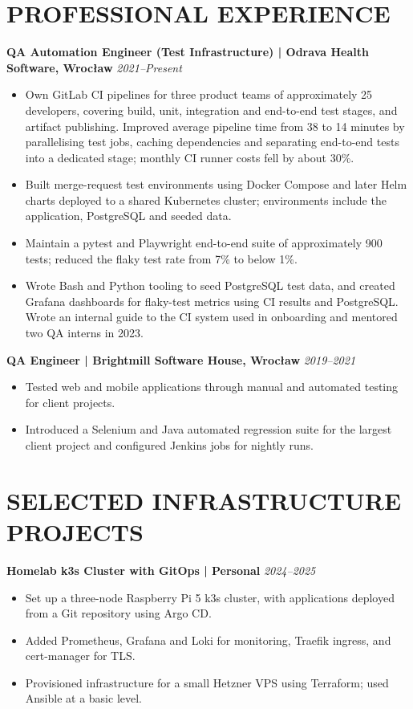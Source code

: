 \documentclass[11pt,a4paper]{article}
\begin{document}
\section*{PROFESSIONAL EXPERIENCE}
\textbf{QA Automation Engineer (Test Infrastructure) | Odrava Health Software, Wrocław} \hfill \textit{2021–Present}
\begin{itemize}
\item Own GitLab CI pipelines for three product teams of approximately 25 developers, covering build, unit, integration and end-to-end test stages, and artifact publishing. Improved average pipeline time from 38 to 14 minutes by parallelising test jobs, caching dependencies and separating end-to-end tests into a dedicated stage; monthly CI runner costs fell by about 30\%.
\item Built merge-request test environments using Docker Compose and later Helm charts deployed to a shared Kubernetes cluster; environments include the application, PostgreSQL and seeded data.
\item Maintain a pytest and Playwright end-to-end suite of approximately 900 tests; reduced the flaky test rate from 7\% to below 1\%.
\item Wrote Bash and Python tooling to seed PostgreSQL test data, and created Grafana dashboards for flaky-test metrics using CI results and PostgreSQL. Wrote an internal guide to the CI system used in onboarding and mentored two QA interns in 2023.
\end{itemize}

\textbf{QA Engineer | Brightmill Software House, Wrocław} \hfill \textit{2019–2021}
\begin{itemize}
\item Tested web and mobile applications through manual and automated testing for client projects.
\item Introduced a Selenium and Java automated regression suite for the largest client project and configured Jenkins jobs for nightly runs.
\end{itemize}

\section*{SELECTED INFRASTRUCTURE PROJECTS}
\textbf{Homelab k3s Cluster with GitOps | Personal} \hfill \textit{2024–2025}
\begin{itemize}
\item Set up a three-node Raspberry Pi 5 k3s cluster, with applications deployed from a Git repository using Argo CD.
\item Added Prometheus, Grafana and Loki for monitoring, Traefik ingress, and cert-manager for TLS.
\item Provisioned infrastructure for a small Hetzner VPS using Terraform; used Ansible at a basic level.
\end{itemize}
\end{document}

